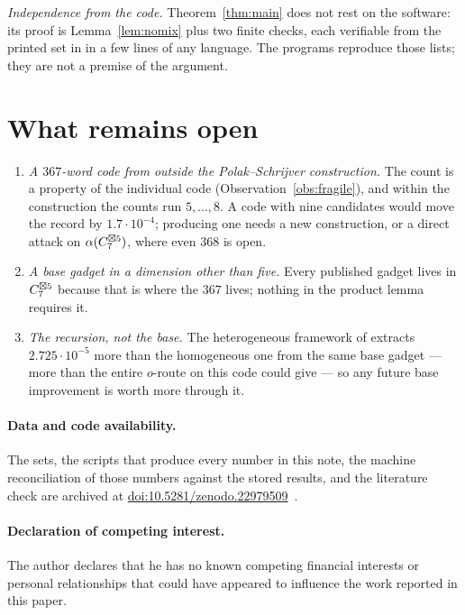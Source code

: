 \emph{Independence from the code.} Theorem~\ref{thm:main} does not rest on the software: its
proof is Lemma~\ref{lem:nomix} plus two finite checks, each verifiable from the printed set in
\cite{polak2019} in a few lines of any language. The programs reproduce those lists; they are
not a premise of the argument.

\section{What remains open}
\label{sec:open}

\begin{enumerate}
\item \emph{A $367$-word code from outside the Polak--Schrijver construction.} The count is a
property of the individual code (Observation~\ref{obs:fragile}), and within the construction the
counts run $5,\dots,8$. A code with nine candidates would move the record by $1.7\cdot10^{-4}$;
producing one needs a new construction, or a direct attack on $\alpha(C_7^{\boxtimes 5})$, where
even $368$ is open.
\item \emph{A base gadget in a dimension other than five.} Every published gadget lives in
$C_7^{\boxtimes 5}$ because that is where the $367$ lives; nothing in the product lemma requires it.
\item \emph{The recursion, not the base.} The heterogeneous framework of \cite{tandon2026}
extracts $2.725\cdot10^{-5}$ more than the homogeneous one from the same base gadget --- more than
the entire $o$-route on this code could give --- so any future base improvement is worth more
through it.
\end{enumerate}

\paragraph{Data and code availability.}
The sets, the scripts that produce every number in this note, the machine reconciliation of
those numbers against the stored results, and the literature check are archived at
\href{https://doi.org/10.5281/zenodo.22979509}{doi:10.5281/zenodo.22979509}~\cite{shannonarchive}.

\paragraph{Declaration of competing interest.}
The author declares that he has no known competing financial interests or personal relationships
that could have appeared to influence the work reported in this paper.

